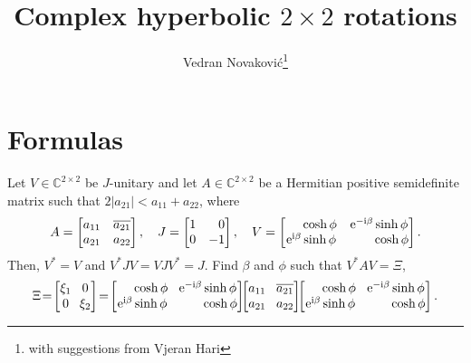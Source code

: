 \documentclass[a4paper,12pt,twoside]{article}
\title{Complex hyperbolic $2\times 2$ rotations}
\author{Vedran Novakovi\'{c}\footnote{with suggestions from Vjeran Hari}}
\begin{document}
\maketitle
\section{Formulas}
Let $V\in\mathbb{C}^{2\times 2}$ be $J$-unitary and let
$A\in\mathbb{C}^{2\times 2}$ be a Hermitian positive semidefinite
matrix such that $2|a_{21}|<a_{11}+a_{22}$, where
\begin{equation}
  A=\begin{bmatrix}
  a_{11} & \overline{a_{21}}\\
  a_{21} & a_{22}
  \end{bmatrix},\quad
  J=\begin{bmatrix}
  1 & \hphantom{-}0\\
  0 & -1
  \end{bmatrix},\quad
  V=\begin{bmatrix}
  \hphantom{\mathrm{e}^{\mathrm{i}\beta}}\cosh\phi & \mathrm{e}^{-\mathrm{i}\beta}\sinh\phi\\
  \mathrm{e}^{\mathrm{i}\beta}\sinh\phi & \hphantom{\mathrm{e}^{-\mathrm{i}\beta}}\cosh\phi
  \end{bmatrix}.
  \label{e:1}
\end{equation}
Then, $V^{\ast}=V$ and $V^{\ast}JV=VJV^{\ast}=J$.  Find $\beta$ and
$\phi$ such that $V^{\ast}AV=\Xi$,
\begin{equation}
  \Xi\!=\!\begin{bmatrix}
  \xi_1 & \!\!0\\
  0 & \!\!\xi_2
  \end{bmatrix}\!=\!\begin{bmatrix}
  \hphantom{\mathrm{e}^{\mathrm{i}\beta}}\cosh\phi & \!\mathrm{e}^{-\mathrm{i}\beta}\sinh\phi\\
  \mathrm{e}^{\mathrm{i}\beta}\sinh\phi & \!\hphantom{\mathrm{e}^{-\mathrm{i}\beta}}\cosh\phi
  \end{bmatrix}\!\!\begin{bmatrix}
  a_{11} & \!\overline{a_{21}}\\
  a_{21} & \!a_{22}
  \end{bmatrix}\!\!\begin{bmatrix}
  \hphantom{\mathrm{e}^{\mathrm{i}\beta}}\cosh\phi & \!\mathrm{e}^{-\mathrm{i}\beta}\sinh\phi\\
  \mathrm{e}^{\mathrm{i}\beta}\sinh\phi & \!\hphantom{\mathrm{e}^{-\mathrm{i}\beta}}\cosh\phi
  \end{bmatrix}.
  \label{e:2}
\end{equation}
\end{document}
